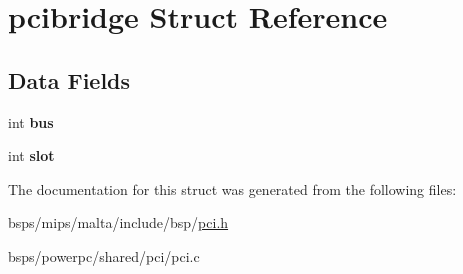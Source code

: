 \hypertarget{structpcibridge}{}\section{pcibridge Struct Reference}
\label{structpcibridge}
\subsection*{Data Fields}
\begin{DoxyCompactItemize}
\item 
\mbox{\label{structpcibridge_a71062682976063ca97aad2beeb75047c}} 
int {\bfseries bus}
\item 
\mbox{\label{structpcibridge_a9cb02bc092d2f9929ecb8895e79bd3db}} 
int {\bfseries slot}
\end{DoxyCompactItemize}


The documentation for this struct was generated from the following files\+:\begin{DoxyCompactItemize}
\item 
bsps/mips/malta/include/bsp/\mbox{\hyperlink{bsps_2mips_2malta_2include_2bsp_2pci_8h}{pci.\+h}}\item 
bsps/powerpc/shared/pci/pci.\+c\end{DoxyCompactItemize}

